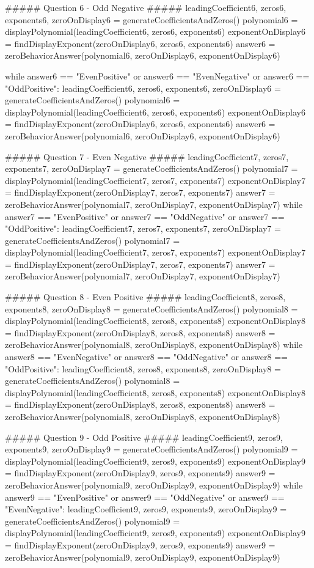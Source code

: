 \documentclass{ximera}
\begin{document}
\begin{sagesilent}
##### Question 6 - Odd Negative #####
leadingCoefficient6, zeros6, exponents6, zeroOnDisplay6 = generateCoefficientsAndZeros()
polynomial6 = displayPolynomial(leadingCoefficient6, zeros6, exponents6)
exponentOnDisplay6 = findDisplayExponent(zeroOnDisplay6, zeros6, exponents6)
answer6 = zeroBehaviorAnswer(polynomial6, zeroOnDisplay6, exponentOnDisplay6)

while answer6 == "EvenPositive" or answer6 == "EvenNegative" or answer6 == "OddPositive":
    leadingCoefficient6, zeros6, exponents6, zeroOnDisplay6 = generateCoefficientsAndZeros()
    polynomial6 = displayPolynomial(leadingCoefficient6, zeros6, exponents6)
    exponentOnDisplay6 = findDisplayExponent(zeroOnDisplay6, zeros6, exponents6)
    answer6 =  zeroBehaviorAnswer(polynomial6, zeroOnDisplay6, exponentOnDisplay6)

##### Question 7 - Even Negative #####
leadingCoefficient7, zeros7, exponents7, zeroOnDisplay7 = generateCoefficientsAndZeros()
polynomial7 = displayPolynomial(leadingCoefficient7, zeros7, exponents7)
exponentOnDisplay7 = findDisplayExponent(zeroOnDisplay7, zeros7, exponents7)
answer7 = zeroBehaviorAnswer(polynomial7, zeroOnDisplay7, exponentOnDisplay7)
while answer7 == "EvenPositive" or answer7 == "OddNegative" or answer7 == "OddPositive":
    leadingCoefficient7, zeros7, exponents7, zeroOnDisplay7 = generateCoefficientsAndZeros()
    polynomial7 = displayPolynomial(leadingCoefficient7, zeros7, exponents7)
    exponentOnDisplay7 = findDisplayExponent(zeroOnDisplay7, zeros7, exponents7)
    answer7 =  zeroBehaviorAnswer(polynomial7, zeroOnDisplay7, exponentOnDisplay7)

##### Question 8 - Even Positive #####
leadingCoefficient8, zeros8, exponents8, zeroOnDisplay8 = generateCoefficientsAndZeros()
polynomial8 = displayPolynomial(leadingCoefficient8, zeros8, exponents8)
exponentOnDisplay8 = findDisplayExponent(zeroOnDisplay8, zeros8, exponents8)
answer8 = zeroBehaviorAnswer(polynomial8, zeroOnDisplay8, exponentOnDisplay8)
while answer8 == "EvenNegative" or answer8 == "OddNegative" or answer8 == "OddPositive":
    leadingCoefficient8, zeros8, exponents8, zeroOnDisplay8 = generateCoefficientsAndZeros()
    polynomial8 = displayPolynomial(leadingCoefficient8, zeros8, exponents8)
    exponentOnDisplay8 = findDisplayExponent(zeroOnDisplay8, zeros8, exponents8)
    answer8 =  zeroBehaviorAnswer(polynomial8, zeroOnDisplay8, exponentOnDisplay8)

##### Question 9 - Odd Positive #####
leadingCoefficient9, zeros9, exponents9, zeroOnDisplay9 = generateCoefficientsAndZeros()
polynomial9 = displayPolynomial(leadingCoefficient9, zeros9, exponents9)
exponentOnDisplay9 = findDisplayExponent(zeroOnDisplay9, zeros9, exponents9)
answer9 = zeroBehaviorAnswer(polynomial9, zeroOnDisplay9, exponentOnDisplay9)
while answer9 == "EvenPositive" or answer9 == "OddNegative" or answer9 == "EvenNegative":
    leadingCoefficient9, zeros9, exponents9, zeroOnDisplay9 = generateCoefficientsAndZeros()
    polynomial9 = displayPolynomial(leadingCoefficient9, zeros9, exponents9)
    exponentOnDisplay9 = findDisplayExponent(zeroOnDisplay9, zeros9, exponents9)
    answer9 =  zeroBehaviorAnswer(polynomial9, zeroOnDisplay9, exponentOnDisplay9)
\end{sagesilent}
\end{document}
